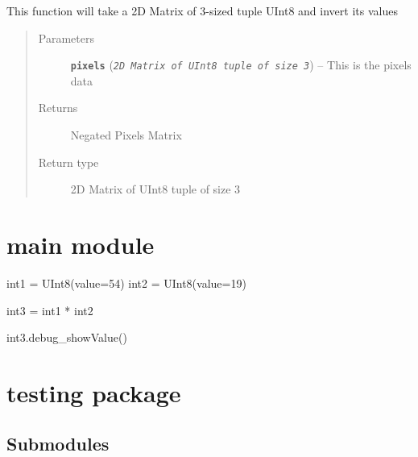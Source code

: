 \documentclass[letterpaper,10pt,english]{sphinxmanual}
\begin{document}
\begin{fulllineitems}
\label{demo:demo.ImageUtils.negate}
This function will take a 2D Matrix of 3-sized tuple UInt8 and invert its values
\begin{quote}\begin{description}
\item[{Parameters}] \leavevmode
\textbf{\texttt{pixels}} (\emph{\texttt{2D Matrix of UInt8 tuple of size 3}}) -- This is the pixels data

\item[{Returns}] \leavevmode
Negated Pixels Matrix

\item[{Return type}] \leavevmode
2D Matrix of UInt8 tuple of size 3

\end{description}\end{quote}

\end{fulllineitems}



\section{main module}
\label{main:module-main}\label{main:main-module}\label{main::doc}

\begin{fulllineitems}
\label{main:main.result}
int1 = UInt8(value=54)
int2 = UInt8(value=19)

int3 = int1 * int2

int3.debug\_showValue()

\end{fulllineitems}



\section{testing package}
\label{testing:testing-package}\label{testing::doc}

\subsection{Submodules}
\label{testing:submodules}
\end{document}
